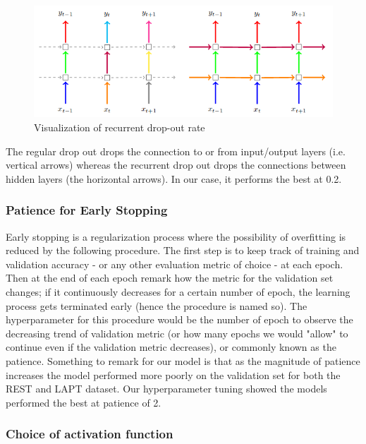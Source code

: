 \documentclass[comsoc,conference]{IEEEtran}
\begin{document}
\begin{figure}[!htb]
\centering
\includegraphics[scale=0.4]{images2/recurrent_drop_out_rate.png}
\caption{Visualization of recurrent drop-out rate}
\label{M2}
\end{figure}

The regular drop out drops the connection to or from input/output layers (i.e. vertical arrows) whereas the recurrent drop out drops the connections between hidden layers (the horizontal arrows). In our case, it performs the best at 0.2.


\subsubsection{Patience for Early Stopping}

Early stopping is a regularization process where the possibility of overfitting is reduced by the following procedure. The first step is to keep track of training and validation accuracy - or any other evaluation metric of choice - at each epoch. Then at the end of each epoch remark how the metric for the validation set changes; if it continuously decreases for a certain number of epoch, the learning process gets terminated early (hence the procedure is named so). The hyperparameter for this procedure would be the number of epoch to observe the decreasing trend of validation metric (or how many epochs we would "allow" to continue even if the validation metric decreases), or commonly known as the patience. Something to remark for our model is that as the magnitude of patience increases the model performed more poorly on the validation set for both the REST and LAPT dataset. Our hyperparameter tuning showed the models performed the best at patience of 2.

\subsubsection{Choice of activation function}
\end{document}
